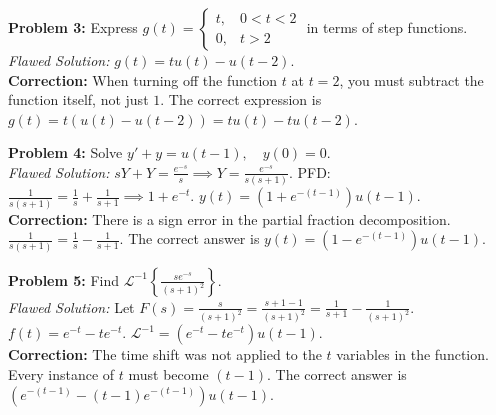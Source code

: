 \documentclass[11pt, letterpaper]{article}
\theoremstyle{definition}
\theoremstyle{remark}
\newcommand{\Lap}{\mathcal{L}}
\begin{document}
\textbf{Problem 3:} Express $g(t) = \begin{cases} t, & 0 < t < 2 \\ 0, & t > 2 \end{cases}$ in terms of step functions.
\\[4pt]
\textit{Flawed Solution:}
$g(t) = t u(t) - u(t-2)$.
\\[4pt]
\textbf{Correction:} When turning off the function $t$ at $t=2$, you must subtract the function itself, not just $1$. The correct expression is $g(t) = t(u(t) - u(t-2)) = t u(t) - t u(t-2)$.

\textbf{Problem 4:} Solve $y' + y = u(t-1), \quad y(0)=0$.
\\[4pt]
\textit{Flawed Solution:}
$sY + Y = \frac{e^{-s}}{s} \implies Y = \frac{e^{-s}}{s(s+1)}$.
PFD: $\frac{1}{s(s+1)} = \frac{1}{s} + \frac{1}{s+1} \implies 1 + e^{-t}$.
$y(t) = (1 + e^{-(t-1)})u(t-1)$.
\\[4pt]
\textbf{Correction:} There is a sign error in the partial fraction decomposition. $\frac{1}{s(s+1)} = \frac{1}{s} - \frac{1}{s+1}$. The correct answer is $y(t) = (1 - e^{-(t-1)})u(t-1)$.

\textbf{Problem 5:} Find $\Lap^{-1}\left\{ \frac{se^{-s}}{(s+1)^2} \right\}$.
\\[4pt]
\textit{Flawed Solution:}
Let $F(s) = \frac{s}{(s+1)^2} = \frac{s+1-1}{(s+1)^2} = \frac{1}{s+1} - \frac{1}{(s+1)^2}$.
$f(t) = e^{-t} - t e^{-t}$.
$\Lap^{-1} = (e^{-t} - t e^{-t})u(t-1)$.
\\[4pt]
\textbf{Correction:} The time shift was not applied to the $t$ variables in the function. Every instance of $t$ must become $(t-1)$. The correct answer is $(e^{-(t-1)} - (t-1)e^{-(t-1)})u(t-1)$.
\end{document}
